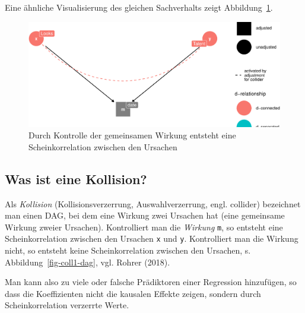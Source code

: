 \documentclass[
  a4paper,
  DIV=11]{scrreprt}
\theoremstyle{definition}
\theoremstyle{remark}
\begin{document}
Eine ähnliche Visualisierung des gleichen Sachverhalts zeigt
Abbildung~\ref{fig-coll2-dag}.

\begin{figure}

{\centering \includegraphics{./kausal_files/figure-pdf/fig-coll2-dag-1.pdf}

}

\caption{\label{fig-coll2-dag}Durch Kontrolle der gemeinsamen Wirkung
entsteht eine Scheinkorrelation zwischen den Ursachen}

\end{figure}

\hypertarget{was-ist-eine-kollision}{%
\subsection{Was ist eine Kollision?}\label{was-ist-eine-kollision}}

Als \emph{Kollision} (Kollisionsverzerrung, Auswahlverzerrung, engl.
collider) bezeichnet man einen DAG, bei dem eine Wirkung zwei Ursachen
hat (eine gemeinsame Wirkung zweier Ursachen). Kontrolliert man die
\emph{Wirkung} \texttt{m}, so entsteht eine Scheinkorrelation zwischen
den Ursachen \texttt{x} und \texttt{y}. Kontrolliert man die Wirkung
nicht, so entsteht keine Scheinkorrelation zwischen den Ursachen, s.
Abbildung~\ref{fig-coll1-dag}, vgl. Rohrer (2018).

\begin{tcolorbox}[enhanced jigsaw, title=\textcolor{quarto-callout-important-color}{\faExclamation}\hspace{0.5em}{Wichtig}, bottomtitle=1mm, bottomrule=.15mm, titlerule=0mm, colbacktitle=quarto-callout-important-color!10!white, colframe=quarto-callout-important-color-frame, leftrule=.75mm, left=2mm, toprule=.15mm, colback=white, arc=.35mm, breakable, toptitle=1mm, opacityback=0, rightrule=.15mm, coltitle=black, opacitybacktitle=0.6]

Man kann also zu viele oder falsche Prädiktoren einer Regression
hinzufügen, so dass die Koeffizienten nicht die kausalen Effekte zeigen,
sondern durch Scheinkorrelation verzerrte Werte.

\end{tcolorbox}
\end{document}
